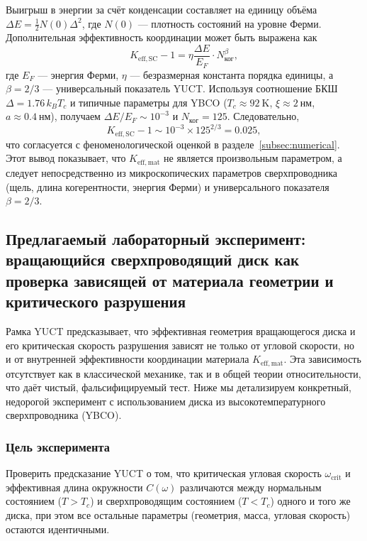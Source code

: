 \documentclass[12pt,a4paper]{article}
\begin{document}
	Выигрыш в энергии за счёт конденсации составляет на единицу объёма \(\Delta E = \frac{1}{2} N(0) \Delta^2\), где \(N(0)\) — плотность состояний на уровне Ферми. Дополнительная эффективность координации может быть выражена как
	\[
	K_{\mathrm{eff,SC}} - 1 = \eta \frac{\Delta E}{E_F} \cdot N_{\text{ког}}^{\beta},
	\]
	где \(E_F\) — энергия Ферми, \(\eta\) — безразмерная константа порядка единицы, а \(\beta = 2/3\) — универсальный показатель YUCT. Используя соотношение БКШ \(\Delta = 1.76 \, k_B T_c\) и типичные параметры для YBCO (\(T_c \approx 92\ \text{K}\), \(\xi \approx 2\ \text{нм}\), \(a \approx 0.4\ \text{нм}\)), получаем \(\Delta E/E_F \sim 10^{-3}\) и \(N_{\text{ког}} = 125\). Следовательно,
	\[
	K_{\mathrm{eff,SC}} - 1 \sim 10^{-3} \times 125^{2/3} = 0.025,
	\]
	что согласуется с феноменологической оценкой в разделе~\ref{subsec:numerical}. Этот вывод показывает, что \(K_{\mathrm{eff,mat}}\) не является произвольным параметром, а следует непосредственно из микроскопических параметров сверхпроводника (щель, длина когерентности, энергия Ферми) и универсального показателя \(\beta = 2/3\).
	
	\subsection{Предлагаемый лабораторный эксперимент: вращающийся сверхпроводящий диск как проверка зависящей от материала геометрии и критического разрушения}
	
	Рамка YUCT предсказывает, что эффективная геометрия вращающегося диска и его критическая скорость разрушения зависят не только от угловой скорости, но и от внутренней эффективности координации материала \(K_{\mathrm{eff,mat}}\). Эта зависимость отсутствует как в классической механике, так и в общей теории относительности, что даёт чистый, фальсифицируемый тест. Ниже мы детализируем конкретный, недорогой эксперимент с использованием диска из высокотемпературного сверхпроводника (YBCO).
	
	\subsubsection{Цель эксперимента}
	
	Проверить предсказание YUCT о том, что критическая угловая скорость \(\omega_{\text{crit}}\) и эффективная длина окружности \(C(\omega)\) различаются между нормальным состоянием (\(T > T_c\)) и сверхпроводящим состоянием (\(T < T_c\)) одного и того же диска, при этом все остальные параметры (геометрия, масса, угловая скорость) остаются идентичными.
	
\end{document}
